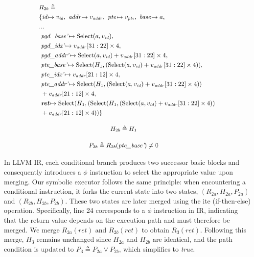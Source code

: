 \begin{equation}
\label{state_2b}
\small
\begin{aligned}
& R_{2b} \triangleq \\
&\{
        \textit{id}\!\mapsto v_{\mathit{id}},\
        \textit{addr}\!\mapsto v_{\mathit{addr}},\
        \textit{pte}\!\mapsto v_{\mathit{pte}},\
        \textit{base}\!\mapsto a,\\
      &...\\
      &\ \textit{pgd\_base'}\!\mapsto \text{Select}(a, v_{\mathit{id}}),\\
      &\ \textit{pgd\_idx'}\!\mapsto v_{\mathit{addr}}[31:22]  \times 4,\\
      &\ \textit{pgd\_addr'}\!\mapsto \text{Select}(a, v_{\mathit{id}}) + v_{\mathit{addr}}[31:22] \times 4,\\
      &\ \textit{pte\_base'}\!\mapsto \text{Select}(H_1, (\text{Select}(a, v_{\mathit{id}}) + v_{\mathit{addr}}[31:22] \times 4)),\\
      &\ \textit{pte\_idx'}\!\mapsto v_{\mathit{addr}}[21:12] \times 4,\\
      &\ \textit{pte\_addr'}\!\mapsto \text{Select}(H_1, (\text{Select}(a, v_{\mathit{id}}) + v_{\mathit{addr}}[31:22] \times 4)) \\
      &\ + v_{\mathit{addr}}[21:12] \times 4, \\
      &\ \textit{\textbf{ret}}\!\mapsto \text{Select}(H_1, (\text{Select}(H_1, (\text{Select}(a, v_{\mathit{id}}) + v_{\mathit{addr}}[31:22] \times 4)) \\
      &\ + v_{\mathit{addr}}[21:12] \times 4))\}
\end{aligned}
\end{equation}

\begin{equation}
\small
\begin{aligned}
& H_{2b} \triangleq H_{1}
\end{aligned}
\end{equation}

\begin{equation}
\small
\begin{aligned}
& P_{2b} \triangleq R_{2b}(\textit{pte\_base'}) \neq 0
\end{aligned}
\end{equation}

In LLVM IR, each conditional branch produces two successor basic blocks and consequently introduces a $\phi$ instruction to select the appropriate value upon merging. Our symbolic executor follows the same principle: when encountering a conditional instruction, it forks the current state into two states, $(R_{2a}, H_{2a}, P_{2a})$ and $(R_{2b}, H_{2b}, P_{2b})$. These two states are later merged using the ite (if-then-else) operation. Specifically, line 24 corresponds to a $\phi$ instruction in IR, indicating that the return value depends on the execution path and must therefore be merged. We merge $R_{2a}(\textit{ret})$ and $R_{2b}(\textit{ret})$ to obtain $R_{3}(\textit{ret})$. Following this merge, $H_{3}$ remains unchanged since $H_{2a}$ and $H_{2b}$ are identical, and the path condition is updated to $P_{3} \triangleq P_{2a} \vee P_{2b}$, which simplifies to \textit{true}.

